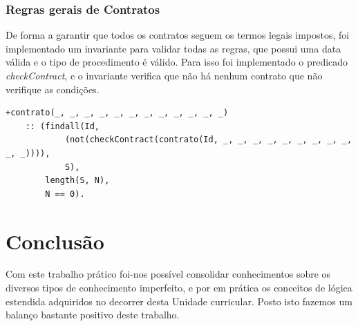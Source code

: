 \documentclass[a4paper]{report}
\begin{document}
\subsection{Regras gerais de Contratos}

De forma a garantir que todos os contratos seguem os termos legais impostos, foi
implementado um invariante para validar todas as regras, que possui uma data
válida e o tipo de procedimento é válido. Para isso foi implementado o predicado
\textit{checkContract}, e o invariante verifica que não há nenhum contrato que
não verifique as condições.

\begin{verbatim}
+contrato(_, _, _, _, _, _, _, _, _, _, _, _) 
    :: (findall(Id, 
            (not(checkContract(contrato(Id, _, _, _, _, _, _, _, _, _, _, _)))),
            S),
        length(S, N),
        N == 0).
\end{verbatim}

\chapter{Conclusão}

Com este trabalho prático foi-nos possível consolidar conhecimentos sobre os
diversos tipos de conhecimento imperfeito, e por em prática os conceitos de
lógica estendida adquiridos no decorrer desta Unidade curricular. Posto isto
fazemos um balanço bastante positivo deste trabalho.
\end{document}
